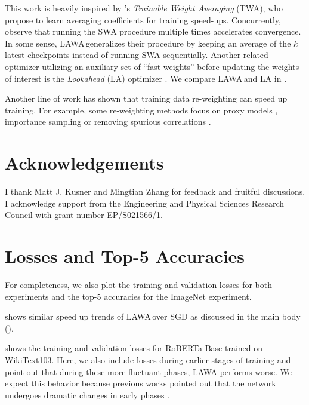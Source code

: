 \documentclass{article}
\newcommand{\method}{LAWA\,}
\begin{document}
This work is heavily inspired by \citet{TWA}'s \emph{Trainable Weight Averaging} (TWA), who propose to learn averaging coefficients for training speed-ups. Concurrently, \citet{guo2022stochastic} observe that running the SWA procedure multiple times accelerates convergence. In some sense, \method generalizes their procedure by keeping an average of the $k$ latest checkpoints instead of running SWA sequentially. Another related optimizer utilizing an auxiliary set of ``fast weights'' before updating the weights of interest is the \emph{Lookahead} (LA) optimizer \cite{lookahead}. We compare \method and LA in .

Another line of work has shown that training data re-weighting can speed up  training. For example, some re-weighting methods focus on proxy models \cite{coleman2019selection,mindermann2022prioritized}, importance sampling \cite{csiba2018importance,katharopoulos2018not} or removing spurious correlations \cite{survey,tang2020long}.



\section*{Acknowledgements} I thank Matt J. Kusner and Mingtian Zhang for feedback and fruitful discussions.
I acknowledge support from the Engineering and Physical Sciences Research Council with grant number EP/S021566/1. 



\newpage

\appendix

\section{Losses and Top-5 Accuracies} \label{app:loss}
For completeness, we also plot the training and validation losses for both experiments and the top-5 accuracies for the ImageNet experiment. 

 shows similar speed up trends of \method over SGD as discussed in the main body ().

 shows the training and validation losses for RoBERTa-Base trained on WikiText103. Here, we also include losses during earlier stages of training and point out that during these more fluctuant phases, LAWA performs worse. We expect this behavior because previous works pointed out that the network undergoes dramatic changes in early phases \cite{sagun2017empirical,gur2018gradient,frankle2020early}.
\end{document}

